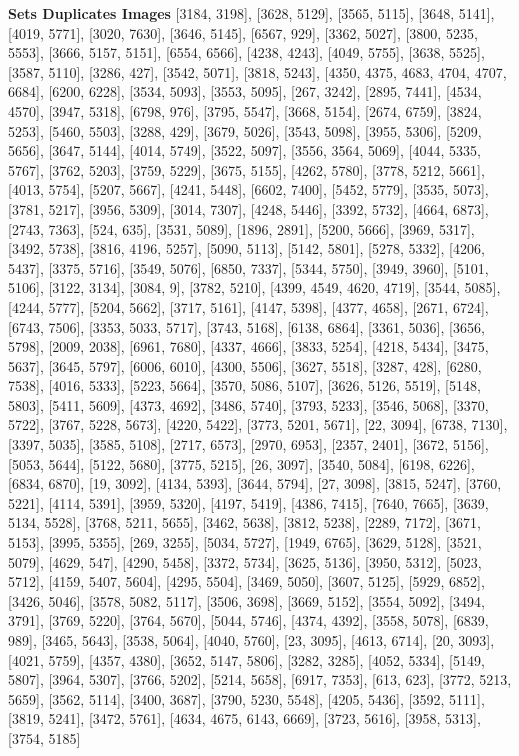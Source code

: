\textbf{Sets Duplicates Images}
[3184, 3198], [3628, 5129], [3565, 5115], [3648, 5141], [4019, 5771], [3020, 7630], [3646, 5145], [6567, 929], [3362, 5027], [3800, 5235, 5553], [3666, 5157, 5151], [6554, 6566], [4238, 4243], [4049, 5755], [3638, 5525], [3587, 5110], [3286, 427], [3542, 5071], [3818, 5243], [4350, 4375, 4683, 4704, 4707, 6684], [6200, 6228], [3534, 5093], [3553, 5095], [267, 3242], [2895, 7441], [4534, 4570], [3947, 5318], [6798, 976], [3795, 5547], [3668, 5154], [2674, 6759], [3824, 5253], [5460, 5503], [3288, 429], [3679, 5026], [3543, 5098], [3955, 5306], [5209, 5656], [3647, 5144], [4014, 5749], [3522, 5097], [3556, 3564, 5069], [4044, 5335, 5767], [3762, 5203], [3759, 5229], [3675, 5155], [4262, 5780], [3778, 5212, 5661], [4013, 5754], [5207, 5667], [4241, 5448], [6602, 7400], [5452, 5779], [3535, 5073], [3781, 5217], [3956, 5309], [3014, 7307], [4248, 5446], [3392, 5732], [4664, 6873], [2743, 7363], [524, 635], [3531, 5089], [1896, 2891], [5200, 5666], [3969, 5317], [3492, 5738], [3816, 4196, 5257], [5090, 5113], [5142, 5801], [5278, 5332], [4206, 5437], [3375, 5716], [3549, 5076], [6850, 7337], [5344, 5750], [3949, 3960], [5101, 5106], [3122, 3134], [3084, 9], [3782, 5210], [4399, 4549, 4620, 4719], [3544, 5085], [4244, 5777], [5204, 5662], [3717, 5161], [4147, 5398], [4377, 4658], [2671, 6724], [6743, 7506], [3353, 5033, 5717], [3743, 5168], [6138, 6864], [3361, 5036], [3656, 5798], [2009, 2038], [6961, 7680], [4337, 4666], [3833, 5254], [4218, 5434], [3475, 5637], [3645, 5797], [6006, 6010], [4300, 5506], [3627, 5518], [3287, 428], [6280, 7538], [4016, 5333], [5223, 5664], [3570, 5086, 5107], [3626, 5126, 5519], [5148, 5803], [5411, 5609], [4373, 4692], [3486, 5740], [3793, 5233], [3546, 5068], [3370, 5722], [3767, 5228, 5673], [4220, 5422], [3773, 5201, 5671], [22, 3094], [6738, 7130], [3397, 5035], [3585, 5108], [2717, 6573], [2970, 6953], [2357, 2401], [3672, 5156], [5053, 5644], [5122, 5680], [3775, 5215], [26, 3097], [3540, 5084], [6198, 6226], [6834, 6870], [19, 3092], [4134, 5393], [3644, 5794], [27, 3098], [3815, 5247], [3760, 5221], [4114, 5391], [3959, 5320], [4197, 5419], [4386, 7415], [7640, 7665], [3639, 5134, 5528], [3768, 5211, 5655], [3462, 5638], [3812, 5238], [2289, 7172], [3671, 5153], [3995, 5355], [269, 3255], [5034, 5727], [1949, 6765], [3629, 5128], [3521, 5079], [4629, 547], [4290, 5458], [3372, 5734], [3625, 5136], [3950, 5312], [5023, 5712], [4159, 5407, 5604], [4295, 5504], [3469, 5050], [3607, 5125], [5929, 6852], [3426, 5046], [3578, 5082, 5117], [3506, 3698], [3669, 5152], [3554, 5092], [3494, 3791], [3769, 5220], [3764, 5670], [5044, 5746], [4374, 4392], [3558, 5078], [6839, 989], [3465, 5643], [3538, 5064], [4040, 5760], [23, 3095], [4613, 6714], [20, 3093], [4021, 5759], [4357, 4380], [3652, 5147, 5806], [3282, 3285], [4052, 5334], [5149, 5807], [3964, 5307], [3766, 5202], [5214, 5658], [6917, 7353], [613, 623], [3772, 5213, 5659], [3562, 5114], [3400, 3687], [3790, 5230, 5548], [4205, 5436], [3592, 5111], [3819, 5241], [3472, 5761], [4634, 4675, 6143, 6669], [3723, 5616], [3958, 5313], [3754, 5185]